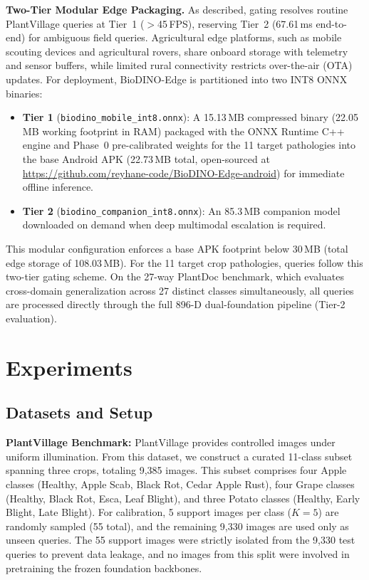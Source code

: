 \documentclass[conference]{IEEEtran}
\begin{document}
\textbf{Two-Tier Modular Edge Packaging.} As described, gating resolves routine PlantVillage queries at Tier~1 ($>$45\,FPS), reserving Tier~2 (67.61\,ms end-to-end) for ambiguous field queries. Agricultural edge platforms, such as mobile scouting devices and agricultural rovers, share onboard storage with telemetry and sensor buffers, while limited rural connectivity restricts over-the-air (OTA) updates. For deployment, BioDINO-Edge is partitioned into two INT8 ONNX binaries:
\begin{itemize}\setlength{\itemsep}{1pt plus 0.5pt}\setlength{\parsep}{0pt}
    \item \textbf{Tier 1} (\texttt{biodino\_\allowbreak mobile\_\allowbreak int8.onnx}): A 15.13\,MB compressed binary (22.05\,MB working footprint in RAM) packaged with the ONNX Runtime C++ engine and Phase~0 pre-calibrated weights for the 11 target pathologies into the base Android APK (22.73\,MB total, open-sourced at \url{https://github.com/reyhane-code/BioDINO-Edge-android}) for immediate offline inference.
    \item \textbf{Tier 2} (\texttt{biodino\_\allowbreak companion\_\allowbreak int8.onnx}): An 85.3\,MB companion model downloaded on demand when deep multimodal escalation is required.
\end{itemize}
This modular configuration enforces a base APK footprint below 30\,MB (total edge storage of 108.03\,MB). For the 11 target crop pathologies, queries follow this two-tier gating scheme. On the 27-way PlantDoc benchmark, which evaluates cross-domain generalization across 27 distinct classes simultaneously, all queries are processed directly through the full 896-D dual-foundation pipeline (Tier-2 evaluation).

\section{Experiments}
\label{sec:experiments}

\subsection{Datasets and Setup}
\label{sec:datasets_setup}
\textbf{PlantVillage Benchmark:} PlantVillage provides controlled images under uniform illumination. From this dataset, we construct a curated 11-class subset spanning three crops, totaling 9,385 images. This subset comprises four Apple classes (Healthy, Apple Scab, Black Rot, Cedar Apple Rust), four Grape classes (Healthy, Black Rot, Esca, Leaf Blight), and three Potato classes (Healthy, Early Blight, Late Blight). For calibration, 5 support images per class ($K=5$) are randomly sampled (55 total), and the remaining 9,330 images are used only as unseen queries. The 55 support images were strictly isolated from the 9,330 test queries to prevent data leakage, and no images from this split were involved in pretraining the frozen foundation backbones.
\end{document}
